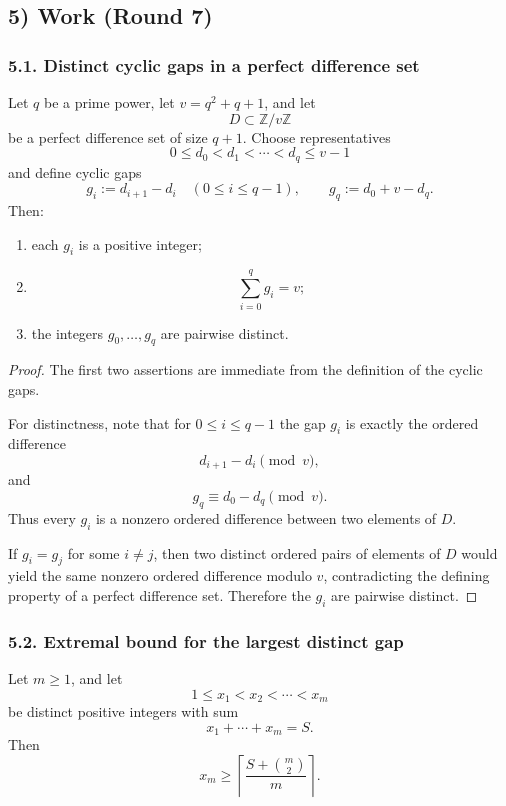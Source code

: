 \subsection{5) Work (Round 7)}

\subsubsection{5.1. Distinct cyclic gaps in a perfect difference set}
\begin{lemma}\label{lem:distinct_gaps}
Let $q$ be a prime power, let $v=q^2+q+1$, and let
\[
D\subset \mathbb Z/v\mathbb Z
\]
be a perfect difference set of size $q+1$.
Choose representatives
\[
0\le d_0<d_1<\cdots<d_q\le v-1
\]
and define cyclic gaps
\[
g_i:=d_{i+1}-d_i\quad(0\le i\le q-1),\qquad g_q:=d_0+v-d_q.
\]
Then:
\begin{enumerate}
\item each $g_i$ is a positive integer;
\item
\[
\sum_{i=0}^q g_i=v;
\]
\item the integers $g_0,\dots,g_q$ are pairwise distinct.
\end{enumerate}
\end{lemma}

\begin{proof}
The first two assertions are immediate from the definition of the cyclic gaps.

For distinctness, note that for $0\le i\le q-1$ the gap $g_i$ is exactly the ordered difference
\[
d_{i+1}-d_i \pmod v,
\]
and
\[
g_q\equiv d_0-d_q \pmod v.
\]
Thus every $g_i$ is a nonzero ordered difference between two elements of $D$.

If $g_i=g_j$ for some $i\neq j$, then two distinct ordered pairs of elements of $D$ would yield the same nonzero ordered difference modulo $v$, contradicting the defining property of a perfect difference set.
Therefore the $g_i$ are pairwise distinct.
\end{proof}

\subsubsection{5.2. Extremal bound for the largest distinct gap}
\begin{lemma}\label{lem:max_distinct}
Let $m\ge 1$, and let
\[
1\le x_1< x_2<\cdots< x_m
\]
be distinct positive integers with sum
\[
x_1+\cdots+x_m=S.
\]
Then
\[
x_m\ge \left\lceil \frac{S+\binom{m}{2}}{m}\right\rceil.
\]
\end{lemma}

